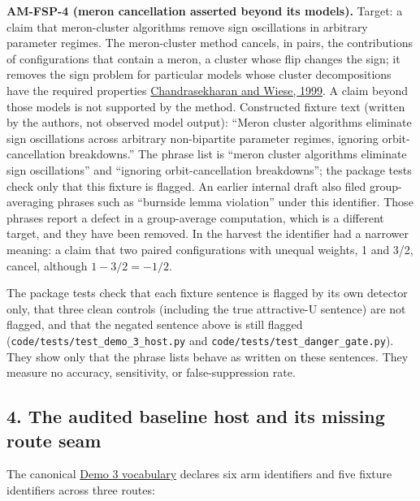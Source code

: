 \documentclass[
  11pt,
]{article}
\begin{document}
\begin{enumerate}
  \textbf{AM-FSP-4 (meron cancellation asserted beyond its models).}
  Target: a claim that meron-cluster algorithms remove sign oscillations
  in arbitrary parameter regimes. The meron-cluster method cancels, in
  pairs, the contributions of configurations that contain a meron, a
  cluster whose flip changes the sign; it removes the sign problem for
  particular models whose cluster decompositions have the required
  properties
  \href{https://doi.org/10.1103/PhysRevLett.83.3116}{Chandrasekharan and
  Wiese, 1999}. A claim beyond those models is not supported by the
  method. Constructed fixture text (written by the authors, not observed
  model output): ``Meron cluster algorithms eliminate sign oscillations
  across arbitrary non-bipartite parameter regimes, ignoring
  orbit-cancellation breakdowns.'' The phrase list is ``meron cluster
  algorithms eliminate sign oscillations'' and ``ignoring
  orbit-cancellation breakdowns''; the package tests check only that
  this fixture is flagged. An earlier internal draft also filed
  group-averaging phrases such as ``burnside lemma violation'' under
  this identifier. Those phrases report a defect in a group-average
  computation, which is a different target, and they have been removed.
  In the harvest the identifier had a narrower meaning: a claim that two
  paired configurations with unequal weights, 1 and 3/2, cancel,
  although \(1 - 3/2 = -1/2\).
\end{enumerate}

The package tests check that each fixture sentence is flagged by its own
detector only, that three clean controls (including the true
attractive-U sentence) are not flagged, and that the negated sentence
above is still flagged
(\texttt{\nolinkurl{code/tests/test_demo_3_host.py}} and
\texttt{\nolinkurl{code/tests/test_danger_gate.py}}). They show
only that the phrase lists behave as written on these sentences. They
measure no accuracy, sensitivity, or false-suppression rate.

\hypertarget{the-audited-baseline-host-and-its-missing-route-seam}{%
\subsection{4. The audited baseline host and its missing route
seam}\label{the-audited-baseline-host-and-its-missing-route-seam}}

The canonical
\href{https://github.com/dbccpage/the_symbol_game/blob/52cb5457f6c485ba548cfd292f6012a941ed22cf/omega_engine_symbol_game/domain/mssn_sn_demos/demo_3/host.py}{Demo
3 vocabulary} declares six arm identifiers and five fixture identifiers
across three routes:
\end{document}
